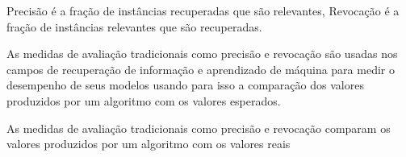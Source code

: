 

% 
% 
% 
% 



Precisão é a fração de instâncias recuperadas que são relevantes, 
Revocação é a fração de instâncias relevantes que são recuperadas.





As medidas de avaliação tradicionais como precisão e revocação são usadas nos campos de recuperação de informação e aprendizado de máquina para medir o desempenho de seus modelos usando para isso a comparação dos valores produzidos por um algoritmo com os valores esperados.



As medidas de avaliação tradicionais como precisão e revocação comparam os valores produzidos por um algoritmo com os valores reais 



